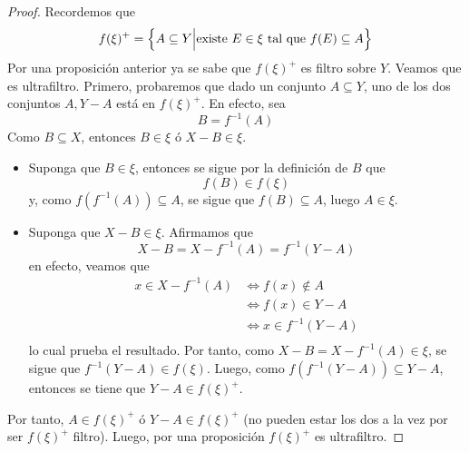 \documentclass[12pt]{report}
\theoremstyle{largebreak}
\begin{document}
    \begin{proof}
        Recordemos que
        \begin{equation*}
            f(\xi)^+=\left\{A\subseteq Y\Big|\textup{existe }E\in\xi\textup{ tal que }f(E)\subseteq A \right\}
        \end{equation*}
        Por una proposición anterior ya se sabe que $f(\xi)^+$ es filtro sobre $Y$. Veamos que es ultrafiltro. Primero, probaremos que dado un conjunto $A\subseteq Y$, uno de los dos conjuntos $A,Y-A$ está en $f(\xi)^+$. En efecto, sea
        \begin{equation*}
            B=f^{-1}(A)
        \end{equation*}
        Como $B\subseteq X$, entonces $B\in\xi$ ó $X-B\in \xi$.
        \begin{itemize}
            \item Suponga que $B\in\xi$, entonces se sigue por la definición de $B$ que
            \begin{equation*}
                f(B)\in f(\xi)
            \end{equation*}
            y, como $f(f^{-1}(A))\subseteq A$, se sigue que $f(B)\subseteq A$, luego $A\in\xi$.
            \item Suponga que $X-B\in\xi$. Afirmamos que
            \begin{equation*}
                X-B=X-f^{-1}(A)=f^{-1}(Y-A)
            \end{equation*}
            en efecto, veamos que
            \begin{equation*}
                \begin{split}
                    x\in X-f^{-1}(A)&\iff f(x)\notin A\\
                    &\iff f(x)\in Y-A\\
                    &\iff x\in f^{-1}(Y-A)\\
                \end{split}
            \end{equation*}
            lo cual prueba el resultado. Por tanto, como $X-B=X-f^{-1}(A)\in \xi$, se sigue que $f^{-1}(Y-A)\in f(\xi)$. Luego, como $f(f^{-1}(Y-A))\subseteq Y-A$, entonces se tiene que $Y-A\in f(\xi)^+$.
        \end{itemize}
        Por tanto, $A\in f(\xi)^+$ ó $Y-A\in f(\xi)^+$ (no pueden estar los dos a la vez por ser $f(\xi)^+$ filtro). Luego, por una proposición $f(\xi)^+$ es ultrafiltro.
    \end{proof}
\end{document}
